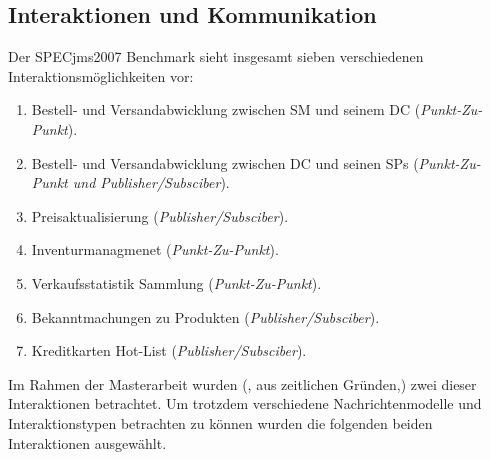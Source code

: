 \subsection{Interaktionen und Kommunikation}
Der SPECjms2007 Benchmark sieht insgesamt sieben verschiedenen Interaktionsmöglichkeiten vor: 
\begin{enumerate}
    \item Bestell- und Versandabwicklung zwischen SM und seinem DC (\emph{Punkt-Zu-Punkt}).
    \item Bestell- und Versandabwicklung zwischen DC und seinen SPs (\emph{Punkt-Zu-Punkt und Publisher/Subsciber}).
    \item Preisaktualisierung (\emph{Publisher/Subsciber}).
    \item Inventurmanagmenet (\emph{Punkt-Zu-Punkt}).
    \item Verkaufsstatistik Sammlung (\emph{Punkt-Zu-Punkt}).
    \item Bekanntmachungen zu Produkten (\emph{Publisher/Subsciber}).
    \item Kreditkarten Hot-List (\emph{Publisher/Subsciber}).
    
\end{enumerate}
Im Rahmen der Masterarbeit wurden (, aus zeitlichen Gründen,) zwei dieser Interaktionen betrachtet. Um trotzdem verschiedene Nachrichtenmodelle und Interaktionstypen betrachten zu können wurden die folgenden beiden Interaktionen ausgewählt.
